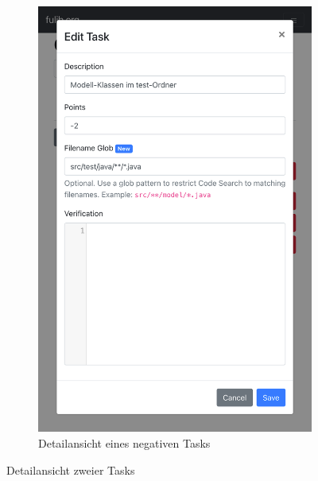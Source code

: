 \begin{figure}
\begin{subfigure}[t]{0.475\textwidth}
        \includegraphics[width=\textwidth]{images/assignment-create-tasks-detail-2}
        \caption{Detailansicht eines negativen Tasks}
        \label{fig:assignment-create-tasks-detail-2}
    \end{subfigure}
    \caption{Detailansicht zweier Tasks}
    \label{fig:assignment-create-tasks-detail}
\end{figure}

